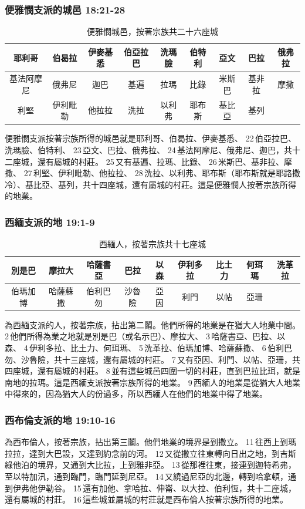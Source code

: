 \subsubsection{便雅憫支派的城邑 18:21-28}
\begin{table}[H]
\centering
\begin{tabular}{|c|c|c|c|c|c|c|c|c|}
\hline
\hline
 耶利哥 &伯曷拉 &伊麥基悉 &伯亞拉巴 &洗瑪臉 &伯特利 &亞文 &巴拉 &俄弗拉  \\\hline
 基法阿摩尼 &俄弗尼 &迦巴 &基遍 &拉瑪 &比錄 &米斯巴 &基非拉 &摩撒\\\hline
 利堅 &伊利毗勒 &他拉拉 &洗拉 &以利弗 &耶布斯 &基比亞 &基列 &\\\hline
 \end{tabular}
\caption{便雅憫城邑，按著宗族共二十六座城}
\end{table}
便雅憫支派按著宗族所得的城邑就是耶利哥、伯曷拉、伊麥基悉、 22 伯亞拉巴、洗瑪臉、伯特利、 23 亞文、巴拉、俄弗拉、 24 基法阿摩尼、俄弗尼、迦巴，共十二座城，還有屬城的村莊。 25 又有基遍、拉瑪、比錄、 26 米斯巴、基非拉、摩撒、 27 利堅、伊利毗勒、他拉拉、 28 洗拉、以利弗、耶布斯（耶布斯就是耶路撒冷）、基比亞、基列，共十四座城，還有屬城的村莊。這是便雅憫人按著宗族所得的地業。


\subsubsection{西緬支派的地 19:1-9}
\begin{table}[H]
\centering
\begin{tabular}{|c|c|c|c|c|c|c|c|c|}
\hline
\hline
 別是巴 &摩拉大 &哈薩書亞&巴拉&以森&伊利多拉&比土力&何珥瑪&洗革拉 \\\hline
 伯瑪加博&哈薩蘇撒&伯利巴勿&沙魯險&亞因&利門&以帖&亞珊&\\\hline
 \end{tabular}
\caption{西緬人，按著宗族共十七座城}
\end{table}
為西緬支派的人，按著宗族，拈出第二鬮。他們所得的地業是在猶大人地業中間。 2 他們所得為業之地就是別是巴（或名示巴）、摩拉大、 3 哈薩書亞、巴拉、以森、 4 伊利多拉、比土力、何珥瑪、 5 洗革拉、伯瑪加博、哈薩蘇撒、 6 伯利巴勿、沙魯險，共十三座城，還有屬城的村莊。 7 又有亞因、利門、以帖、亞珊，共四座城，還有屬城的村莊。 8 並有這些城邑四圍一切的村莊，直到巴拉比珥，就是南地的拉瑪。這是西緬支派按著宗族所得的地業。 9 西緬人的地業是從猶大人地業中得來的，因為猶大人的份過多，所以西緬人在他們的地業中得了地業。

\subsubsection{西布倫支派的地 19:10-16}
為西布倫人，按著宗族，拈出第三鬮。他們地業的境界是到撒立。 11 往西上到瑪拉拉，達到大巴設，又達到約念前的河。 12 又從撒立往東轉向日出之地，到吉斯綠他泊的境界，又通到大比拉，上到雅非亞。 13 從那裡往東，接連到迦特希弗，至以特加汛，通到臨門，臨門延到尼亞。 14 又繞過尼亞的北邊，轉到哈拿頓，通到伊弗他伊勒谷。 15 還有加他、拿哈拉、伸崙、以大拉、伯利恆，共十二座城，還有屬城的村莊。 16 這些城並屬城的村莊就是西布倫人按著宗族所得的地業。

